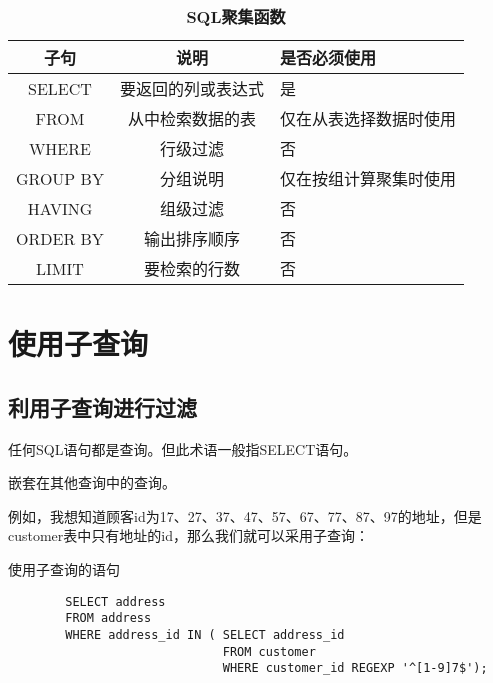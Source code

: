 \documentclass[UTF8]{article}
\begin{document}
\begin{table}[H]
        \caption{\textbf{SQL聚集函数}}%
        \centering%
        \begin{tabular}{ccl}%
        \toprule%
        \textbf{子句} & \textbf{说明} & \textbf{是否必须使用} \\
        \midrule
        SELECT & 要返回的列或表达式 & 是 \\
        FROM & 从中检索数据的表 & 仅在从表选择数据时使用 \\
        WHERE & 行级过滤 & 否 \\
        GROUP BY & 分组说明 & 仅在按组计算聚集时使用 \\
        HAVING & 组级过滤 & 否 \\
        ORDER BY & 输出排序顺序 & 否 \\
        LIMIT & 要检索的行数 & 否 \\
        \bottomrule
        \end{tabular}
\end{table}  

\section{使用子查询}

\subsection{利用子查询进行过滤}

\begin{redbox}[frametitle={Defination 14.1.1 查询（query）}]
        任何SQL语句都是查询。但此术语一般指SELECT语句。
\end{redbox}

\begin{redbox}[frametitle={Defination 14.1.2 子查询（subquery）}]
        嵌套在其他查询中的查询。
\end{redbox}

例如，我想知道顾客id为17、27、37、47、57、67、77、87、97的地址，但是customer表中只有地址的id，那么我们就可以采用子查询：

\begin{listing}[H]
	\caption{使用子查询的语句}
	\label{code:usesubqueryclause}
\begin{verbatim}
        SELECT address 
        FROM address 
        WHERE address_id IN ( SELECT address_id 
                              FROM customer 
                              WHERE customer_id REGEXP '^[1-9]7$');
\end{verbatim}
\end{listing}
\end{document}
